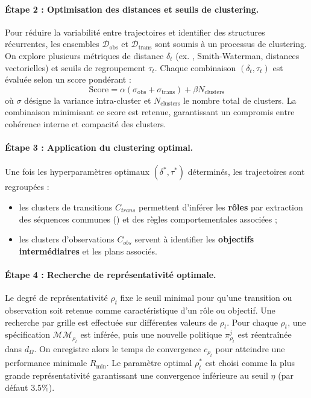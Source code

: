 \paragraph{Étape 2 : Optimisation des distances et seuils de clustering.}
Pour réduire la variabilité entre trajectoires et identifier des structures récurrentes, les ensembles $\mathcal{D}_{\text{obs}}$ et $\mathcal{D}_{\text{trans}}$ sont soumis à un processus de clustering.
On explore plusieurs métriques de distance $\delta_t$ (ex. , Smith-Waterman, distances vectorielles) et seuils de regroupement $\tau_t$.
Chaque combinaison $(\delta_t, \tau_t)$ est évaluée selon un score pondérant :
\[
    \text{Score} = \alpha (\sigma_{\text{obs}} + \sigma_{\text{trans}}) + \beta N_{\text{clusters}}
\]
où $\sigma$ désigne la variance intra-cluster et $N_{\text{clusters}}$ le nombre total de clusters.
La combinaison minimisant ce score est retenue, garantissant un compromis entre cohérence interne et compacité des clusters.

\paragraph{Étape 3 : Application du clustering optimal.}
Une fois les hyperparamètres optimaux $(\delta^*, \tau^*)$ déterminés, les trajectoires sont regroupées :
\begin{itemize}
    \item les clusters de transitions $C_{trans}$ permettent d’inférer les \textbf{rôles} par extraction des séquences communes () et des règles comportementales associées ;
    \item les clusters d’observations $C_{obs}$ servent à identifier les \textbf{objectifs intermédiaires} et les plans associés.
\end{itemize}

\paragraph{Étape 4 : Recherche de représentativité optimale.}
Le degré de représentativité $\rho_t$ fixe le seuil minimal pour qu’une transition ou observation soit retenue comme caractéristique d’un rôle ou objectif.
Une recherche par grille est effectuée sur différentes valeurs de $\rho_t$.
Pour chaque $\rho_t$, une spécification $\mathcal{MM}_{\rho_t}$ est inférée, puis une nouvelle politique $\pi^j_{\rho_t}$ est réentraînée dans $d_\Omega$.
On enregistre alors le temps de convergence $c_{\rho_t}$ pour atteindre une performance minimale $R_{\min}$.
Le paramètre optimal $\rho_t^*$ est choisi comme la plus grande représentativité garantissant une convergence inférieure au seuil $\eta$ (par défaut 3.5\%).


